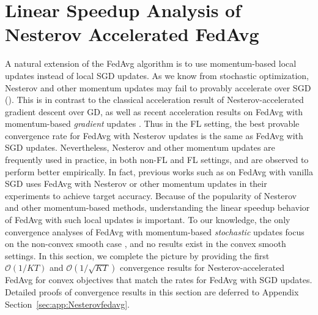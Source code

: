 


\section{Linear Speedup Analysis of Nesterov Accelerated FedAvg}
\label{sec:Nesterov}

A natural extension of the FedAvg algorithm is to use momentum-based 
local updates instead of local SGD updates. As we know from stochastic optimization, Nesterov and other momentum
updates may fail to provably accelerate over SGD (\cite{liu2018accelerating,kidambi2018insufficiency,liu2018toward,yuan2020federated}). This is in contrast to the classical acceleration result of Nesterov-accelerated gradient descent over GD, as well as recent acceleration results on FedAvg with momentum-based \emph{gradient} updates \cite{liu2019accelerating,yang2020federated}. Thus in the FL setting, the best provable convergence rate for FedAvg with Nesterov updates is the same as FedAvg with SGD updates. Nevertheless, Nesterov and other momentum updates are frequently used in practice, in both non-FL and FL settings, and are observed to perform better empirically. In fact, previous works such as \cite{stich2018local} on FedAvg with vanilla SGD uses FedAvg with Nesterov or other momentum updates in their experiments to achieve target accuracy. Because of the popularity of Nesterov and other momentum-based methods, understanding the linear speedup behavior of FedAvg with such local updates is important. To our knowledge, the
only convergence analyses of FedAvg with momentum-based \emph{stochastic} updates focus on the non-convex smooth case \cite{huo2020faster,yu2019linear,li2018federated}, and no results exist in the convex smooth settings. In this section, we complete the picture by providing the first $\mathcal{O}(1/KT)$
and $\mathcal{O}(1/\sqrt{KT})$ convergence results for Nesterov-accelerated
FedAvg for convex objectives that match the rates for FedAvg with SGD updates. Detailed proofs of convergence results in this section are deferred to Appendix Section~\ref{sec:app:Nesterovfedavg}.

